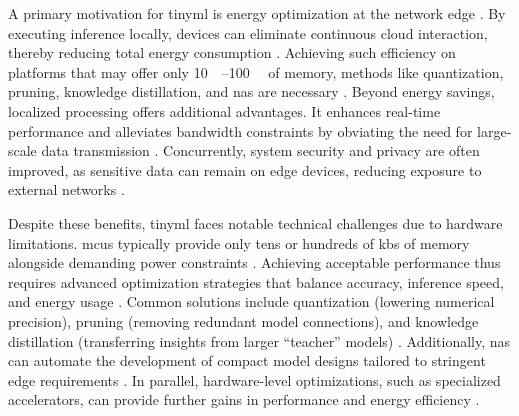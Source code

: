 A primary motivation for \gls{tinyml} is energy optimization at the network edge \cite{tekinReviewOndeviceMachine2024, tsoukasReviewEmergingTechnology2024}. By executing inference locally, devices can eliminate continuous cloud interaction, thereby reducing total energy consumption \cite{duttaTinyMLMeetsIoT2021}. Achieving such efficiency on platforms that may offer only \SIrange{10}{100}{\kilo\byte} of memory, methods like quantization, pruning, knowledge distillation, and \gls{nas} are necessary \cite{capogrossoMachineLearningOrientedSurvey2024, tekinReviewOndeviceMachine2024}. Beyond energy savings, localized processing offers additional advantages. It enhances real-time performance and alleviates bandwidth constraints by obviating the need for large-scale data transmission \cite{tsoukasReviewEmergingTechnology2024, gillEdgeAITaxonomy2024}. Concurrently, system security and privacy are often improved, as sensitive data can remain on edge devices, reducing exposure to external networks \cite{immonenTinyMachineLearning2022, duttaTinyMLMeetsIoT2021}.

Despite these benefits, \gls{tinyml} faces notable technical challenges due to hardware limitations. \gls{mcu}s typically provide only tens or hundreds of \glspl{kb} of memory alongside demanding power constraints \cite{zaidiUnlockingEdgeIntelligence2022, immonenTinyMachineLearning2022}. Achieving acceptable performance thus requires advanced optimization strategies that balance accuracy, inference speed, and energy usage \cite{capogrossoMachineLearningOrientedSurvey2024, szydloManagementTinyMLEnabled2024, disabatoTinyMachineLearning2024}. Common solutions include quantization (lowering numerical precision), pruning (removing redundant model connections), and knowledge distillation (transferring insights from larger ``teacher'' models) \cite{tekinReviewOndeviceMachine2024, gillEdgeAITaxonomy2024}. Additionally, \gls{nas} can automate the development of compact model designs tailored to stringent edge requirements \cite{tsoukasReviewEmergingTechnology2024}. In parallel, hardware-level optimizations, such as specialized accelerators, can provide further gains in performance and energy efficiency \cite{gillEdgeAITaxonomy2024}.

